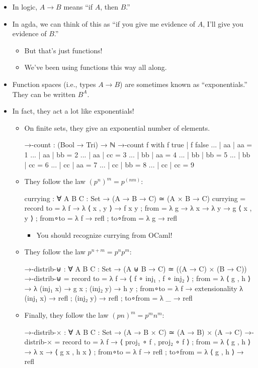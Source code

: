 \documentclass{lecturenotes}
\begin{document}
\begin{itemize}
\item In logic, $A \to B$ means ``if $A$, then $B$.''
\item In agda, we can think of this as ``if you give me evidence of $A$, I'll give you evidence of $B$.''
  \begin{itemize}
  \item But that's just functions!
  \item We've been using functions this way all along.
  \end{itemize}
\item Function spaces (i.e., types $A \to B$) are sometimes known as ``exponentials.''
  They can be written $B^A$.
\item In fact, they act a lot like exponentials!
  \begin{itemize}
  \item On finite sets, they give an exponential number of elements.
\begin{code}
→-count : (Bool → Tri) → ℕ
→-count f with f true | f false 
... | aa | aa = 1
... | aa | bb = 2
... | aa | cc = 3
... | bb | aa = 4
... | bb | bb = 5
... | bb | cc = 6
... | cc | aa = 7
... | cc | bb = 8
... | cc | cc = 9      
\end{code}
\item They follow the law $(p^n)^m = p^{(nm)}$:
\begin{code}
currying : ∀ {A B C : Set} → (A → B → C) ≃ (A × B → C)
currying =
  record
  {
    to      = λ {f → λ { ⟨ x , y ⟩ → f x y}}
  ; from    = λ {g → λ {x → λ {y → g ⟨ x , y ⟩}}}
  ; from∘to = λ {f → refl }
  ; to∘from = λ {g → refl }
  }    
\end{code}
\begin{itemize}
\item You should recognize currying from OCaml!
\end{itemize}
\item They follow the law $p^{n + m} = p^n p^m$:
\begin{code}
→-distrib-⊎ : ∀ {A B C : Set} → (A ⊎ B → C) ≃ ((A → C) × (B → C))
→-distrib-⊎ =
  record
  {
    to      = λ {f → ⟨ f ∘ inj₁ , f ∘ inj₂ ⟩}
  ; from    = λ { ⟨ g , h ⟩ → λ { (inj₁ x) → g x ; (inj₂ y) → h y}}
  ; from∘to = λ {f → extensionality λ { (inj₁ x) → refl ; (inj₂ y) → refl}}
  ; to∘from = λ {_ → refl}
  }    
\end{code}
\item Finally, they follow the law $(pn)^m = p^m n^m$:
\begin{code}
→-distrib-× : ∀ {A B C : Set} → (A → B × C) ≃ (A → B) × (A → C)
→-distrib-× =
  record
  {
    to      = λ {f → ⟨ proj₁ ∘ f , proj₂ ∘ f ⟩}
  ; from    = λ { ⟨ g , h ⟩ → λ x → ⟨ g x , h x ⟩}
  ; from∘to = λ {f → refl}
  ; to∘from =  λ { ⟨ g , h ⟩ → refl }
  }    
\end{code}
  \end{itemize}
\end{itemize}
\end{document}
